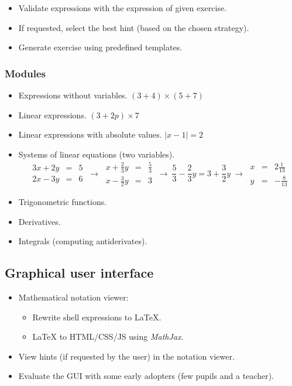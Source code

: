 \documentclass[10pt,a4paper]{article}
\begin{document}
\begin{itemize}
    \item Validate expressions with the expression of given exercise.
    \item If requested, select the best hint (based on the chosen strategy).
    \item Generate exercise using predefined templates.
\end{itemize}

\subsubsection{Modules}

\begin{itemize}
    \item Expressions without variables. $(3+4) \times (5+7)$
    \item Linear expressions. $(3+2p) \times 7$
    \item Linear expressions with absolute values. $|x-1| = 2$
    \item Systems of linear equations (two variables).
    $$ \
    \begin{array}{|rcr|}
    3x + 2y & = & 5 \\
    2x - 3y & = & 6
    \end{array}
    \
    \rightarrow
    \
    \begin{array}{|rcr|}
    x + \frac{2}{3}y & = & \frac{5}{3} \\
    x - \frac{3}{2}y & = & 3
    \end{array}
    \
    \rightarrow
    \
    \frac{5}{3} - \frac{2}{3}y = 3 + \frac{3}{2}y
    \
    \rightarrow
    \
    \begin{array}{|rcr|}
    x & = & 2\frac{1}{13} \\
    y & = & -\frac{8}{13}
    \end{array}
    $$
    \item Trigonometric functions.
    \item Derivatives.
    \item Integrals (computing antiderivates).
\end{itemize}

\subsection{Graphical user interface}

\begin{itemize}
    \item Mathematical notation viewer:
    \begin{itemize}
        \item Rewrite shell expressions to \LaTeX.
        \item \LaTeX $ $ to HTML/CSS/JS using \emph{MathJax}.
    \end{itemize}
    \item View hints (if requested by the user) in the notation viewer.
    \item Evaluate the GUI with some early adopters (few pupils and a teacher).
\end{itemize}
\end{document}
